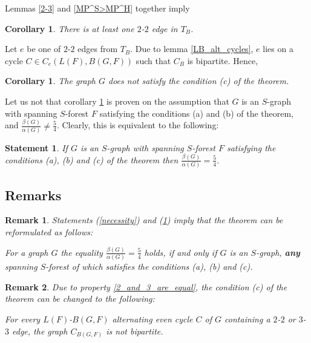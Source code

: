 \documentclass[a4paper, 12pt]{article}
\newtheorem{statement}{Statement}
\newtheorem{corollary}[lemma]{Corollary}
\newtheorem{remark}{Remark}
\begin{document}
Lemmas \ref{2-3} and \ref{MP^S>MP^H} together imply
\begin{corollary} \label{at_least_one_2-2}
There is at least one $2$-$2$ edge in $T_B$.
\end{corollary}

Let $e$ be one of $2$-$2$ edges from $T_B$. Due to lemma
\ref{LB_alt_cycles}, $e$ lies on a cycle $C \in C_e(L(F), B(G,F))$
such that $C_B$ is bipartite. Hence,

\begin{corollary} \label{does_not_satisfy_c}
The graph $G$ does not satisfy the condition (c) of the theorem.
\end{corollary}

\bigskip

Let us not that corollary \ref{does_not_satisfy_c} is proven on the
assumption that $G$ is an $S$-graph with spanning $S$-forest $F$
satisfying the conditions (a) and (b) of the theorem, and
$\frac{\beta(G)}{\alpha(G)} \neq \frac{5}{4}$. Clearly, this is
equivalent to the following:

\begin{statement}\label{sufficiency}
If $G$ is an $S$-graph with spanning $S$-forest $F$ satisfying the
conditions (a), (b) and (c) of the theorem then
$\frac{\beta(G)}{\alpha(G)} = \frac{5}{4}$.
\end{statement}


\subsection{Remarks}

\begin{remark}
Statements (\ref{necessity}) and (\ref{sufficiency}) imply that the
theorem can be reformulated as follows:

\textit{For a graph $G$ the equality
$\frac{\beta(G)}{\alpha(G)}=\frac{5}{4}$ holds, if and only if $G$
is an $S$-graph, \textbf{any} spanning $S$-forest of which satisfies
the conditions (a), (b) and (c).}
\end{remark}

\begin{remark}
Due to property \ref{2_and_3_are_equal}, the condition (c) of the
theorem can be changed to the following:

\textit{For every $L(F)$-$B(G,F)$ alternating even cycle $C$ of $G$
containing a $2$-$2$ or $3$-$3$ edge, the graph $C_{B(G,F)}$ is not
bipartite.}
\end{remark}
\end{document}

